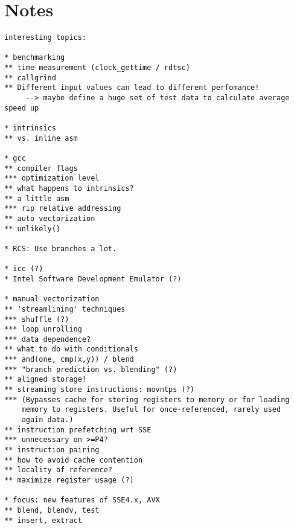 \section{Notes}
\begin{verbatim}
interesting topics:

* benchmarking
** time measurement (clock_gettime / rdtsc)
** callgrind
** Different input values can lead to different perfomance!
	 --> maybe define a huge set of test data to calculate average speed up

* intrinsics
** vs. inline asm

* gcc
** compiler flags
*** optimization level
** what happens to intrinsics?
** a little asm
*** rip relative addressing
** auto vectorization
** unlikely()

* RCS: Use branches a lot.

* icc (?)
* Intel Software Development Emulator (?)

* manual vectorization
** 'streamlining' techniques
*** shuffle (?)
*** loop unrolling
*** data dependence?
** what to do with conditionals
*** and(one, cmp(x,y)) / blend
*** "branch prediction vs. blending" (?)
** aligned storage!
** streaming store instructions: movntps (?)
*** (Bypasses cache for storing registers to memory or for loading
    memory to registers. Useful for once-referenced, rarely used
    again data.)
** instruction prefetching wrt SSE
*** unnecessary on >=P4?
** instruction pairing
** how to avoid cache contention
** locality of reference? 
** maximize register usage (?)

* focus: new features of SSE4.x, AVX
** blend, blendv, test
** insert, extract
\end{verbatim}